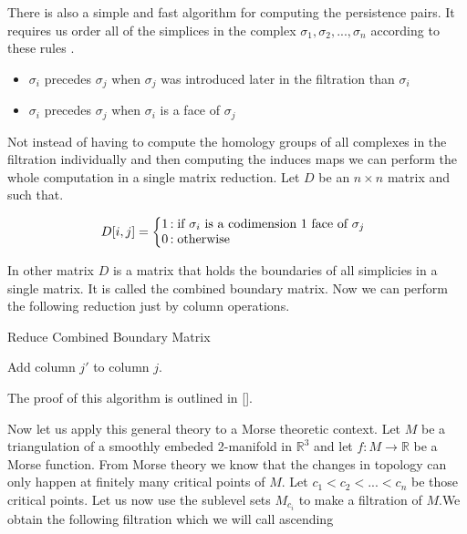 There is also a simple and fast algorithm for computing the persistence pairs. It requires us order all of the simplices in the complex $\sigma_1, \sigma_2, ..., \sigma_n$ according to these rules \cite{ph-a-survey}.

\begin{itemize}
    \item $\sigma_i$ precedes $\sigma_j$ when $\sigma_j$ was introduced later in the filtration than $\sigma_i$
    \item $\sigma_i$ precedes $\sigma_j$ when $\sigma_i$ is a face of $\sigma_j$
\end{itemize}

Not instead of having to compute the homology groups of all complexes in the filtration individually and then computing the induces maps we can perform the whole computation in a single matrix reduction. Let $D$ be an $n\times n$ matrix and such that.

   $$
   D[i, j] = \left\{
       \begin{array}{@{}l@{\thinspace}l}
           \text{1}  &: \text{if } \sigma_i \text{ is a codimension 1 face of } \sigma_j \\
           \text{0}  &: \text{otherwise} \\
       \end{array}
   \right.
   $$

In other matrix $D$ is a matrix that holds the boundaries of all simplicies in a single matrix. It is called the combined boundary matrix. Now we can perform the following reduction just by column operations.


\begin{algorithm}
\caption{Reduce Combined Boundary Matrix}

\begin{algorithmic}[1]


        \State Add column $j'$ to column $j$.
    \EndWhile
\EndFor

\end{algorithmic}
\end{algorithm}

The proof of this algorithm is outlined in [].

Now let us apply this general theory to a Morse theoretic context. Let $M$ be a triangulation of a smoothly embeded 2-manifold in $\mathbb{R}^3$ and let $f : M \to \mathbb{R}$ be a Morse function. From Morse theory we know that the changes in topology can only happen at finitely many critical points of $M$. Let $c_1 < c_2 < ... < c_n$ be those critical points. Let us now use the sublevel sets $M_{c_i}$  to make a filtration of $M$.We obtain the following filtration which we will call ascending


